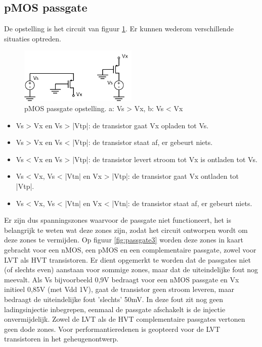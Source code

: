 \subsection{pMOS passgate}
De opstelling is het circuit van figuur \ref{fig:passgate2}. Er kunnen wederom verschillende situaties optreden.

\begin{figure}[h!]
  \centering
  \includegraphics[width=0.5\textwidth]{../fig/hfdst-periphery-passgate2.png}
  \caption[pMOS passgate]{pMOS passgate opstelling. a: Vs > Vx, b: Vs < Vx}
  \label{fig:passgate2}
\end{figure}

\begin{itemize}
\item Vs > Vx en Vs > |Vtp|: de transistor gaat Vx opladen tot Vs.
\item Vs > Vx en Vs < |Vtp|: de transistor staat af, er gebeurt niets.
\item Vs < Vx en Vs > |Vtp|: de transistor levert stroom tot Vx is ontladen tot Vs.
\item Vs < Vx, Vs < |Vtn| en Vx > |Vtp|: de transistor gaat Vx ontladen tot |Vtp|.
\item Vs < Vx, Vs < |Vtn| en Vx < |Vtn|: de transistor staat af, er gebeurt niets.
\end{itemize}

Er zijn dus spanningszones waarvoor de passgate niet functioneert, het is belangrijk te weten wat deze zones zijn, zodat het circuit ontworpen wordt om deze zones te vermijden. 
Op figuur \ref{fig:passgate3} worden deze zones in kaart gebracht voor een nMOS, een pMOS en een complementaire passgate, zowel voor LVT als HVT transistoren. Er dient opgemerkt te worden dat de passgates niet (of slechts even) aanstaan voor sommige zones, maar dat de uiteindelijke fout nog meevalt.
Als Vs bijvoorbeeld 0,9V bedraagt voor een nMOS passgate en Vx initieel 0,85V (met Vdd 1V), gaat de transistor geen stroom leveren, maar bedraagt de uiteindelijke fout 'slechts' 50mV.
In deze fout zit nog geen ladingsinjectie inbegrepen, eenmaal de passgate afschakelt is de injectie onvermijdelijk.
Zowel de LVT als de HVT complementaire passgates vertonen geen dode zones. Voor performantieredenen is geopteerd voor de LVT transistoren in het geheugenontwerp.

